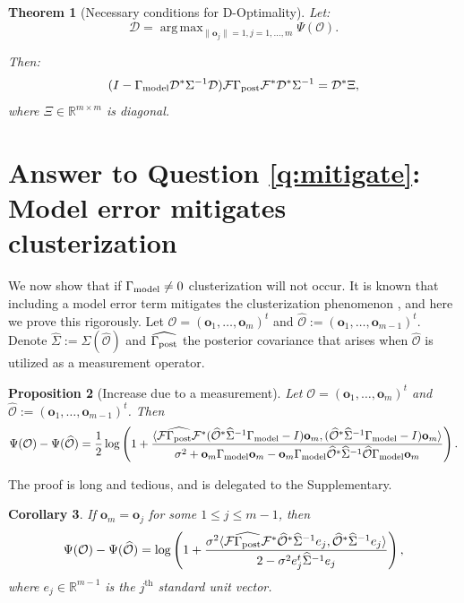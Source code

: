 \documentclass[ba]{imsart}
\newcommand{\obs}{\mathcal{O}}
\newcommand{\fwd}{\mathcal{F}}
\newcommand{\obsm}{\widehat{\obs}}
\newcommand{\Sigmam}{\widehat{\Sigma}}
\newcommand{\postcovm}{\widehat{\Gamma_{\textup{post}}}}
\newcommand{\tar}{\Psi}
\DeclareMathOperator*{\argmax}{arg\,max}
\newcommand{\meas}{\mathbf{o}}
\newcommand{\opt}{\mathcal{D}}
\theoremstyle{plain}
\newtheorem{theorem}{Theorem}
\newtheorem{corollary}[theorem]{Corollary}
\newtheorem{proposition}[theorem]{Proposition}
\theoremstyle{definition}
\theoremstyle{remark}
\begin{document}
\begin{theorem}[Necessary conditions for D-Optimality]\label{thm:constrained}
  Let:
  \begin{equation*}
    \opt = \argmax_{\|\meas_j\| = 1, j=1,\dots,m}\tar(\obs).
  \end{equation*}
  
  Then:
  \begin{equation*}
    ( I - \modcov \opt^* \Sigma^{-1} \opt) \fwd \postcov \fwd^* \opt^*  \Sigma^{-1}
    = \opt^* \Xi, 
  \end{equation*}
  where $\Xi \in \mathbb{R}^{m \times m}$ is diagonal.
\end{theorem}




 \section{Answer to Question \ref{q:mitigate}: Model error mitigates clusterization}\label{section:non_vanishing}
We now show that if $\Gamma_{\textup{model}} \neq 0$ clusterization will not occur. It
is known that including a model error term mitigates the
clusterization phenomenon \cite{Ucinski05}, and here we prove this
rigorously. Let $\obs = (\meas_1,\dots,\meas_m)^t$ and $\obsm :=
(\meas_1,\dots,\meas_{m-1})^t$. Denote $\Sigmam := \Sigma (\obsm)$ and
$\postcovm$ the posterior covariance that arises when $\obsm$ is
utilized as a measurement operator.

\begin{proposition}[Increase due to a measurement]\label{prop:design_increase}
  Let $\obs = (\meas_1,\dots,\meas_m)^t$ and $\obsm :=
  (\meas_1,\dots,\meas_{m-1})^t$. Then
  \begin{equation}\label{eq:conclusion}
    \tar( \obs ) - \tar (\obsm ) =
    \frac12 \log \left ( 1 + \frac{
      \langle \fwd \postcovm \fwd^* (\obsm^* \Sigmam^{-1} \modcov - I ) \meas_m,
      (\obsm^* \Sigmam^{-1} \modcov - I ) \meas_m \rangle
    }{
      \sigma^2 + \meas_m \modcov \meas_m - \meas_m \modcov \obsm^* \Sigmam^{-1} \obsm \modcov \meas_m 
    }       
    \right ).
  \end{equation}
\end{proposition}
The proof is long and tedious, and is delegated to the Supplementary.


\begin{corollary}\label{cor:same_meas}
  If $\meas_m = \meas_j$ for some $1 \leq j \leq m-1$, then
  \begin{equation*}
    \tar(\obs) - \tar(\obsm) =
    \log \left ( 1 + \frac{\sigma^2
      \langle \fwd \postcovm \fwd^* \obsm^* \Sigmam^{-1} e_j,
      \obsm^* \Sigmam^{-1}e_j \rangle
    }{
      2 - \sigma^2 e_j^t\Sigmam^{-1}e_j 
    }       
    \right ),
  \end{equation*}
  where $e_j\in \mathbb{R}^{m-1}$ is the $j^{\text{th}}$ standard unit
  vector.
\end{corollary}
\end{document}
